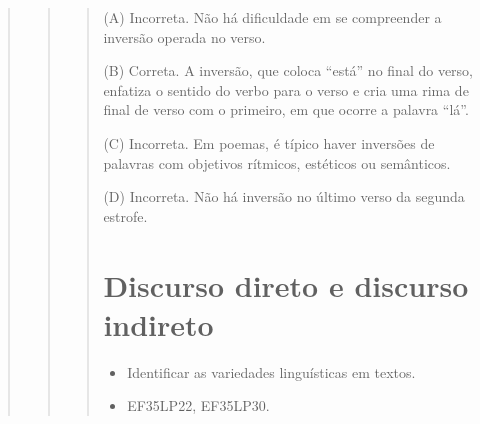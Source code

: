 \begin{boxlist}
{{\begin{quote}
\begin{quote}
\begin{quote}
(A) Incorreta. Não há dificuldade em se compreender a inversão operada no verso.

(B) Correta. A inversão, que coloca ``está'' no final do verso, enfatiza o sentido do verbo para o verso e cria uma rima de final de verso com o primeiro, em que ocorre a palavra ``lá''.

(C) Incorreta. Em poemas, é típico haver inversões de palavras com objetivos rítmicos, estéticos ou semânticos.

(D) Incorreta. Não há inversão no último verso da segunda estrofe.

\chapter{Discurso direto e discurso indireto}


\begin{itemize}
  \item Identificar as variedades linguísticas em textos.
\end{itemize}


\begin{itemize}
  \item EF35LP22, EF35LP30.
\end{itemize}

\end{quote}
\end{quote}
\end{quote}}}
\end{boxlist}
